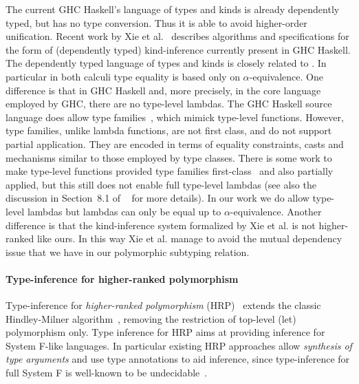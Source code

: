 The current GHC Haskell's language of types and kinds
is already dependently typed, but has no type conversion. Thus
it is able to avoid higher-order unification. Recent work by
Xie et al.~\cite{xie20kind} describes algorithms and specifications
for the form of (dependently typed) kind-inference currently present in GHC Haskell.
The dependently typed language of types and kinds is closely related
to \name. In particular in both calculi type equality is based only
on $\alpha$-equivalence. One difference is that in GHC Haskell and, more precisely,
in the core language employed by GHC, there
are no type-level lambdas. The GHC Haskell source language does allow
type families~\cite{assoctypes}, which mimick type-level functions. However,
type families, unlike lambda functions, are not first class, and do not support partial application.
They are encoded
in terms of equality constraints, casts and mechanisms similar to those
employed by type classes. There is some work to make type-level functions
provided type families first-class~\cite{kiss19higher} and also partially applied, but this
still does not enable full type-level lambdas (see also the discussion in Section~8.1
of ~\cite{kiss19higher} for more details).
In our work we do allow type-level lambdas
but lambdas can only be equal up to $\alpha$-equivalence.
Another difference is that the kind-inference system formalized by Xie et al.
is not higher-ranked like ours. In this way Xie et al. manage to avoid
the mutual dependency issue that we have in our polymorphic subtyping relation.

\begin{comment}
Thus our focus is on Haskell-like languages with dependently typed
features and explicit casts, rather than languages like Agda or Idris
which typically have a conversion rule that triggers implicit type level
computation.
\end{comment}


\paragraph{Type-inference for higher-ranked polymorphism}
Type-inference for \emph{higher-ranked polymorphism}
(HRP)~\cite{dunfield2013complete,le2003ml,leijen2008hmf,vytiniotis2008fph,jones2007practical,Serrano2018, odersky1996putting}
extends the classic Hindley-Milner algorithm~\cite{hindley1969principal,milner1978theory,damas1982principal},
removing the restriction of top-level (let) polymorphism only. Type
inference for HRP aims at providing inference for System F-like
languages. In particular existing HRP approaches allow \emph{synthesis of type arguments}
and use type annotations to aid
inference, since type-inference for full System F is
well-known to be undecidable~\cite{wells1999typability}.

